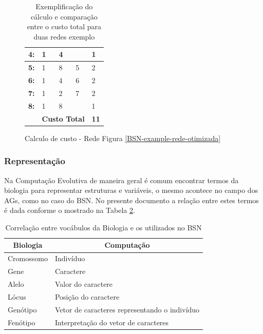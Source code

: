 \begin{table}[t!]
\begin{subfigure}[t]{0.4\textwidth}
\begin{tabular}{lllll}
			\multicolumn{1}{|l|}{\textbf{4:}} & 1 & 4 & \multicolumn{1}{l|}{} & \multicolumn{1}{l|}{1} \\ \hline
			\multicolumn{1}{|l|}{\textbf{5:}} & 1 & 8 & \multicolumn{1}{l|}{5} & \multicolumn{1}{l|}{2} \\ \hline
			\multicolumn{1}{|l|}{\textbf{6:}} & 1 & 4 & \multicolumn{1}{l|}{6} & \multicolumn{1}{l|}{2} \\ \hline
			\multicolumn{1}{|l|}{\textbf{7:}} & 1 & 2 & \multicolumn{1}{l|}{7} & \multicolumn{1}{l|}{2} \\ \hline
			\multicolumn{1}{|l|}{\textbf{8:}} & 1 & 8 & \multicolumn{1}{l|}{} & \multicolumn{1}{l|}{1} \\ \hline
			 & \multicolumn{3}{l}{\textbf{Custo Total}} & \textbf{11}
			\end{tabular}
	\caption{Calculo de custo - Rede Figura \ref{BSN-example-rede-otimizada}}
	\label{tab-custo-rede-bsn-otimizada}
	\end{subfigure}
	\caption[Exemplo de cálculo de custo total em rede]{Exemplificação do cálculo e comparação entre o custo total para duas redes exemplo}
	\label{tab_calc_custo}
\end{table}

\subsubsection{Representação}
Na Computação Evolutiva de maneira geral é comum encontrar termos da biologia para representar estruturas e variáveis, o mesmo acontece no campo dos AGs, como no caso do BSN. No presente documento a relação entre estes termos é dada conforme o mostrado na Tabela \ref{tab-correlacao-bio-comp}.

\begin{table}[ht]
\centering
\begin{tabular}{|l|l|}
\hline
\multicolumn{1}{|c|}{\textbf{Biologia}} & \multicolumn{1}{c|}{\textbf{Computação}} \\ \hline
Cromossomo & Indivíduo \\ \hline
Gene & Caractere \\ \hline
Alelo & Valor do caractere \\ \hline
Lócus & Posição do caractere \\ \hline
Genótipo & Vetor de caracteres representando o indivíduo \\ \hline
Fenótipo & Interpretação do vetor de caracteres \\ \hline
\end{tabular}
\caption[Biologia x BSN]{Correlação entre vocábulos da Biologia e os utilizados no BSN}
\label{tab-correlacao-bio-comp}
\end{table}  

